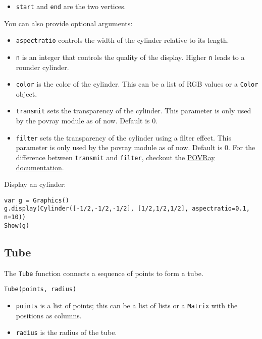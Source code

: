 \begin{itemize}

\item
  \texttt{start} and \texttt{end} are the two vertices.
\end{itemize}

You can also provide optional arguments:

\begin{itemize}

\item
  \texttt{aspectratio} controls the width of the cylinder relative to
  its length.
\item
  \texttt{n} is an integer that controls the quality of the display.
  Higher \texttt{n} leads to a rounder cylinder.
\item
  \texttt{color} is the color of the cylinder. This can be a list of RGB
  values or a \texttt{Color} object.
\item
  \texttt{transmit} sets the transparency of the cylinder. This
  parameter is only used by the povray module as of now. Default is 0.
\item
  \texttt{filter} sets the transparency of the cylinder using a filter
  effect. This parameter is only used by the povray module as of now.
  Default is 0. For the difference between \texttt{transmit} and
  \texttt{filter}, checkout the
  \href{http://xahlee.info/3d/povray-glassy.html}{POVRay documentation}.
\end{itemize}

Display an cylinder:

\begin{lstlisting}
var g = Graphics()
g.display(Cylinder([-1/2,-1/2,-1/2], [1/2,1/2,1/2], aspectratio=0.1, n=10))
Show(g)
\end{lstlisting}

\hypertarget{tube}{%
\subsection{Tube}\label{tube}}

The \texttt{Tube} function connects a sequence of points to form a tube.

\begin{lstlisting}
Tube(points, radius)
\end{lstlisting}

\begin{itemize}

\item
  \texttt{points} is a list of points; this can be a list of lists or a
  \texttt{Matrix} with the positions as columns.
\item
  \texttt{radius} is the radius of the tube.
\end{itemize}

